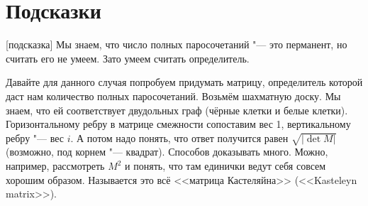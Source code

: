\section{Подсказки}
[подсказка]
	Мы знаем, что число полных паросочетаний "--- это перманент, но считать его не умеем.
	Зато умеем считать определитель.

	Давайте для данного случая попробуем придумать матрицу, определитель которой даст нам количество полных паросочетаний.
	Возьмём шахматную доску.
	Мы знаем, что ей соответствует двудольных граф (чёрные клетки и белые клетки).
	Горизонтальному ребру в матрице смежности сопоставим вес 1, вертикальному ребру "--- вес $i$.
	А потом надо понять, что ответ получится равен $\sqrt{|\det M|}$ (возможно, под корнем "--- квадрат).
	Способов доказывать много.
	Можно, например, рассмотреть $M^2$ и понять, что там единички ведут себя совсем хорошим образом.
	Называется это всё <<матрица Кастеляйна>> (<<Kasteleyn matrix>>).
